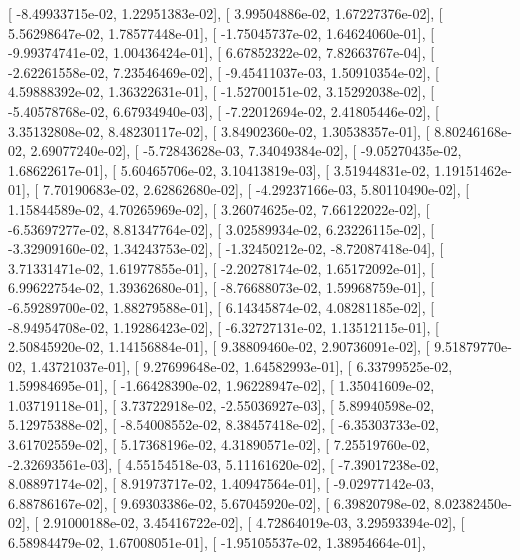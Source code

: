 \documentclass{article}
\begin{document}
       [ -8.49933715e-02,   1.22951383e-02],
       [  3.99504886e-02,   1.67227376e-02],
       [  5.56298647e-02,   1.78577448e-01],
       [ -1.75045737e-02,   1.64624060e-01],
       [ -9.99374741e-02,   1.00436424e-01],
       [  6.67852322e-02,   7.82663767e-04],
       [ -2.62261558e-02,   7.23546469e-02],
       [ -9.45411037e-03,   1.50910354e-02],
       [  4.59888392e-02,   1.36322631e-01],
       [ -1.52700151e-02,   3.15292038e-02],
       [ -5.40578768e-02,   6.67934940e-03],
       [ -7.22012694e-02,   2.41805446e-02],
       [  3.35132808e-02,   8.48230117e-02],
       [  3.84902360e-02,   1.30538357e-01],
       [  8.80246168e-02,   2.69077240e-02],
       [ -5.72843628e-03,   7.34049384e-02],
       [ -9.05270435e-02,   1.68622617e-01],
       [  5.60465706e-02,   3.10413819e-03],
       [  3.51944831e-02,   1.19151462e-01],
       [  7.70190683e-02,   2.62862680e-02],
       [ -4.29237166e-03,   5.80110490e-02],
       [  1.15844589e-02,   4.70265969e-02],
       [  3.26074625e-02,   7.66122022e-02],
       [ -6.53697277e-02,   8.81347764e-02],
       [  3.02589934e-02,   6.23226115e-02],
       [ -3.32909160e-02,   1.34243753e-02],
       [ -1.32450212e-02,  -8.72087418e-04],
       [  3.71331471e-02,   1.61977855e-01],
       [ -2.20278174e-02,   1.65172092e-01],
       [  6.99622754e-02,   1.39362680e-01],
       [ -8.76688073e-02,   1.59968759e-01],
       [ -6.59289700e-02,   1.88279588e-01],
       [  6.14345874e-02,   4.08281185e-02],
       [ -8.94954708e-02,   1.19286423e-02],
       [ -6.32727131e-02,   1.13512115e-01],
       [  2.50845920e-02,   1.14156884e-01],
       [  9.38809460e-02,   2.90736091e-02],
       [  9.51879770e-02,   1.43721037e-01],
       [  9.27699648e-02,   1.64582993e-01],
       [  6.33799525e-02,   1.59984695e-01],
       [ -1.66428390e-02,   1.96228947e-02],
       [  1.35041609e-02,   1.03719118e-01],
       [  3.73722918e-02,  -2.55036927e-03],
       [  5.89940598e-02,   5.12975388e-02],
       [ -8.54008552e-02,   8.38457418e-02],
       [ -6.35303733e-02,   3.61702559e-02],
       [  5.17368196e-02,   4.31890571e-02],
       [  7.25519760e-02,  -2.32693561e-03],
       [  4.55154518e-03,   5.11161620e-02],
       [ -7.39017238e-02,   8.08897174e-02],
       [  8.91973717e-02,   1.40947564e-01],
       [ -9.02977142e-03,   6.88786167e-02],
       [  9.69303386e-02,   5.67045920e-02],
       [  6.39820798e-02,   8.02382450e-02],
       [  2.91000188e-02,   3.45416722e-02],
       [  4.72864019e-03,   3.29593394e-02],
       [  6.58984479e-02,   1.67008051e-01],
       [ -1.95105537e-02,   1.38954664e-01],
\end{document}
